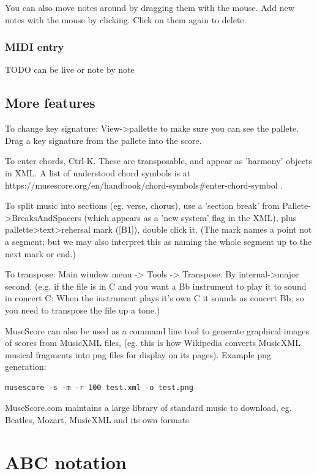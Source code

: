 \documentclass[oneside,english]{scrbook}
\begin{document}
You can also move notes around by dragging them with the mouse. Add new notes with the mouse by clicking. Click on them again to delete.

\subsubsection{MIDI entry}
TODO can be live or note by note

\subsection{More features}

To change key signature: View->pallette to make sure you can see the pallete. Drag a key signature from the pallete into the score.

To enter chords, Ctrl-K.  These are transposable, and appear as 'harmony' objects in XML.  A list of understood chord symbols is at https://musescore.org/en/handbook/chord-symbols#enter-chord-symbol . 

To split music into sections (eg. verse, chorus), use a 'section break' from Pallete->BreaksAndSpacers (which appears as a 'new system' flag in the XML), plus pallette>text>rehersal mark ([B1]), double click it. (The mark names a point not a segment; but we may also interpret this as naming the whole segment up to the next mark or end.)

To transpose: Main window menu -> Tools -> Transpose.    By internal->major second.
(e.g. if the file is in C and you want a Bb instrument to play it to sound in concert C:   When the instrument plays it's own C it sounds as concert Bb, so you need to transpose the file up a tone.)

MuseScore can also be used as a command line tool to generate graphical images of scores from MusicXML files, (eg. this is how Wikipedia converts MusicXML musical fragments into png files for display on its pages). Example png generation:

\begin{verbatim}
musescore -s -m -r 100 test.xml -o test.png
\end{verbatim}

MuseScore.com maintains a large library of standard music to download, eg. Beatles, Mozart, MusicXML and its own formats.

\section{ABC notation}
\end{document}
